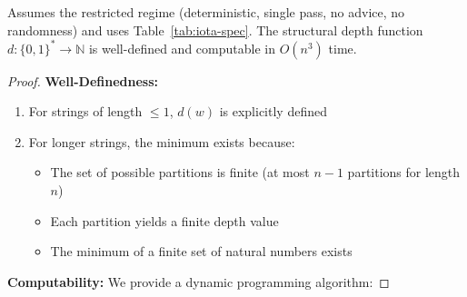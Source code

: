 \begin{lemma}
Assumes the restricted regime (deterministic, single pass, no advice, no randomness) and uses Table~\ref{tab:iota-spec}.
The structural depth function $d: \{0,1\}^* \to \mathbb{N}$ is well-defined and computable in $O(n^3)$ time.
\end{lemma}

\begin{proof}
\textbf{Well-Definedness:}
\begin{enumerate}
\item For strings of length $\leq 1$, $d(w)$ is explicitly defined
\item For longer strings, the minimum exists because:
  \begin{itemize}
  \item The set of possible partitions is finite (at most $n-1$ partitions for length $n$)
  \item Each partition yields a finite depth value
  \item The minimum of a finite set of natural numbers exists
  \end{itemize}
\end{enumerate}

\textbf{Computability:}
We provide a dynamic programming algorithm:


\end{proof}

